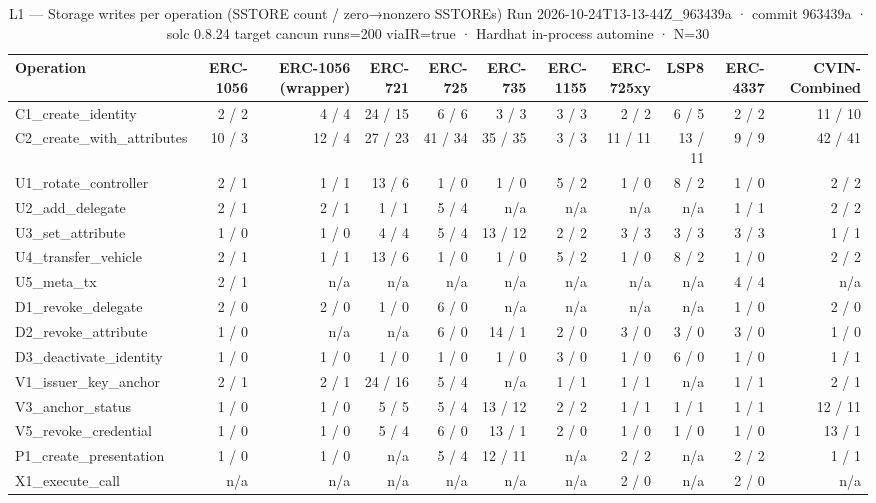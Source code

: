 \begin{table}[ht]
\centering
\small
\begin{tabular}{lrrrrrrrrrr}
\toprule
Operation & ERC-1056 & ERC-1056 (wrapper) & ERC-721 & ERC-725 & ERC-735 & ERC-1155 & ERC-725xy & LSP8 & ERC-4337 & CVIN-Combined \\
\midrule
C1\_create\_identity & 2 / 2 & 4 / 4 & 24 / 15 & 6 / 6 & 3 / 3 & 3 / 3 & 2 / 2 & 6 / 5 & 2 / 2 & 11 / 10 \\
C2\_create\_with\_attributes & 10 / 3 & 12 / 4 & 27 / 23 & 41 / 34 & 35 / 35 & 3 / 3 & 11 / 11 & 13 / 11 & 9 / 9 & 42 / 41 \\
U1\_rotate\_controller & 2 / 1 & 1 / 1 & 13 / 6 & 1 / 0 & 1 / 0 & 5 / 2 & 1 / 0 & 8 / 2 & 1 / 0 & 2 / 2 \\
U2\_add\_delegate & 2 / 1 & 2 / 1 & 1 / 1 & 5 / 4 & n/a & n/a & n/a & n/a & 1 / 1 & 2 / 2 \\
U3\_set\_attribute & 1 / 0 & 1 / 0 & 4 / 4 & 5 / 4 & 13 / 12 & 2 / 2 & 3 / 3 & 3 / 3 & 3 / 3 & 1 / 1 \\
U4\_transfer\_vehicle & 2 / 1 & 1 / 1 & 13 / 6 & 1 / 0 & 1 / 0 & 5 / 2 & 1 / 0 & 8 / 2 & 1 / 0 & 2 / 2 \\
U5\_meta\_tx & 2 / 1 & n/a & n/a & n/a & n/a & n/a & n/a & n/a & 4 / 4 & n/a \\
D1\_revoke\_delegate & 2 / 0 & 2 / 0 & 1 / 0 & 6 / 0 & n/a & n/a & n/a & n/a & 1 / 0 & 2 / 0 \\
D2\_revoke\_attribute & 1 / 0 & n/a & n/a & 6 / 0 & 14 / 1 & 2 / 0 & 3 / 0 & 3 / 0 & 3 / 0 & 1 / 0 \\
D3\_deactivate\_identity & 1 / 0 & 1 / 0 & 1 / 0 & 1 / 0 & 1 / 0 & 3 / 0 & 1 / 0 & 6 / 0 & 1 / 0 & 1 / 1 \\
V1\_issuer\_key\_anchor & 2 / 1 & 2 / 1 & 24 / 16 & 5 / 4 & n/a & 1 / 1 & 1 / 1 & n/a & 1 / 1 & 2 / 1 \\
V3\_anchor\_status & 1 / 0 & 1 / 0 & 5 / 5 & 5 / 4 & 13 / 12 & 2 / 2 & 1 / 1 & 1 / 1 & 1 / 1 & 12 / 11 \\
V5\_revoke\_credential & 1 / 0 & 1 / 0 & 5 / 4 & 6 / 0 & 13 / 1 & 2 / 0 & 1 / 0 & 1 / 0 & 1 / 0 & 13 / 1 \\
P1\_create\_presentation & 1 / 0 & 1 / 0 & n/a & 5 / 4 & 12 / 11 & n/a & 2 / 2 & n/a & 2 / 2 & 1 / 1 \\
X1\_execute\_call & n/a & n/a & n/a & n/a & n/a & n/a & 2 / 0 & n/a & 2 / 0 & n/a \\
\bottomrule
\end{tabular}
\caption{L1 — Storage writes per operation (SSTORE count / zero→nonzero SSTOREs) Run 2026-10-24T13-13-44Z\_963439a · commit 963439a · solc 0.8.24 target cancun runs=200 viaIR=true · Hardhat in-process automine · N=30}
\label{tab:crud_storage}
\end{table}

